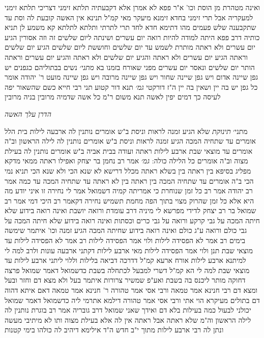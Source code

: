 \documentclass[12pt, openany]{book}
\begin{document}
{ואינה מטהרת מן הוסת וכו' א"ר פפא לא אמרן אלא דקבעתיה תלתא זימני דצריכי תלתא זימני למעקריה אבל תרי זימני בחדא זימנא מיעקר 
מאי קמ"ל תנינא אין האשה קובעת לה וסת עד שתקבענה שלש פעמים מהו דתימא חדא לחד תרי לתרתי ותלתא לתלתא קא משמע לן 
תניא כותיה דרב פפא היתה למודה להיות רואה יום עשרים ושינתה ליום שלשים זה וזה אסורין הגיע יום עשרים ולא ראתה מותרת לשמש עד יום שלשים וחוששת ליום שלשים 
הגיע יום שלשים וראתה הגיע יום עשרים ולא ראתה והגיע יום שלשים ולא ראתה והגיע יום עשרים וראתה הותר יום שלשים
ונאסר יום עשרים מפני שאורח בזמנו בא 
{\large\emph{מתני׳}} נשים בבתוליהם כגפנים יש גפן שיינה אדום ויש גפן שיינה שחור ויש גפן שיינה מרובה ויש גפן שיינה מועט ר' יהודה אומר כל גפן יש בה יין ושאין בה יין ה"ז דורקטי
{\large\emph{גמ׳}} תנא דור קטוע תני רבי חייא כשם שהשאור יפה לעיסה כך דמים יפין לאשה תנא משום ר"מ כל אשה שדמיה מרובין בניה מרובין
\par \par {\large\emph{הדרן עלך האשה}}\par \par 
מתני׳ {\large\emph{תינוקת}} שלא הגיע זמנה לראות וניסת ב"ש אומרים נותנין לה ארבעה לילות בית הלל אומרים עד שתחיה המכה
הגיע זמנה לראות וניסת ב"ש אומרים נותנין לה לילה הראשון וב"ה אומרים עד מוצאי שבת ארבע לילות
ראתה ועודה בבית אביה ב"ש אומרים נותנין לה בעילת מצוה וב"ה אומרים כל הלילה כולה:
{\large\emph{גמ׳}} אמר רב נחמן בר יצחק ואפילו ראתה ממאי מדקא מפליג בסיפא בין ראתה בין בשלא ראתה מכלל דרישא לא שנא הכי ולא שנא הכי 
תניא נמי הכי ב"ה אומרים עד שתחיה המכה בין ראתה בין לא ראתה
עד שתחיה המכה עד כמה אמר רב יהודה אמר רב כל זמן שנוחרת כי אמריתה קמיה דשמואל אמר לי נחירה זו איני יודע מה היא אלא כל זמן שהרוק מצוי בתוך הפה מחמת תשמיש 
נחירה דקאמר רב היכי דמי אמר רב שמואל בר רב יצחק לדידי מפרשא לי מיניה דרב עומדת ורואה יושבת ואינה רואה בידוע שלא חיתה המכה על גבי קרקע ורואה על גבי כרים וכסתות ואינה רואה בידוע שלא חיתה המכה על גבי כולם ורואה ע"ג כולם ואינה רואה בידוע שחיתה המכה
הגיע זמנה וכו' איתמר שימשה בימים רב אמר לא הפסידה לילות ולוי אמר הפסידה לילות 
רב אמר לא הפסידה לילות עד מוצאי שבת תנן ולוי אמר הפסידה לילות מאי ארבע לילות דקתני ארבעה עונות 
ולרב למה לי למיתנא ארבע לילות אורח ארעא קמ"ל דדרכה דביאה בלילות וללוי ליתני ארבע לילות עד מוצאי שבת למה לי הא קמ"ל דשרי למבעל לכתחלה בשבת 
כדשמואל דאמר שמואל פרצה דחוקה מותר ליכנס בה בשבת ואע"פ שמשיר צרורות 
איתמר בעל ולא מצא דם וחזר ובעל ומצא דם רבי חנינא אמר טמאה ורבי אסי אמר טהורה 
ר' חנינא אמר טמאה דאם איתא דהוה דם בתולים מעיקרא הוי אתי ורבי אסי אמר טהורה דילמא אתרמי ליה כדשמואל דאמר שמואל יכולני לבעול כמה בעילות בלא דם ואידך שאני שמואל דרב גובריה 
אמר רב בוגרת נותנין לה לילה הראשון וה"מ שלא ראתה אבל ראתה אין לה אלא בעילת מצוה ותו לא 
מיתיבי מעשה ונתן לה רבי ארבע לילות מתוך י"ב חדש ה"ד אילימא דיהיב לה כולהו בימי קטנות}
\end{document}
